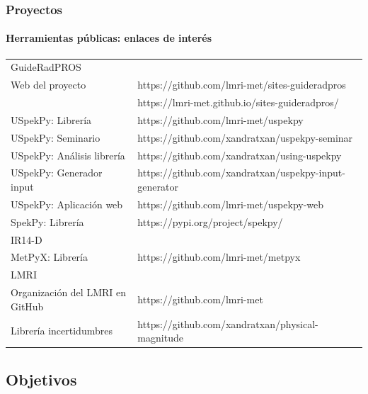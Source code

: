 \documentclass{beamer}
\begin{document}
	\begin{frame}
		\frametitle{Proyectos}
		\framesubtitle{Herramientas públicas: enlaces de interés}
		\centering
		\scriptsize
		\begin{tabular}{ll}			
			\rowcolor{blue!40}
			{\color{white}GuideRadPROS}&\\
			Web del proyecto&https://github.com/lmri-met/sites-guideradpros\\
			&https://lmri-met.github.io/sites-guideradpros/\\
			USpekPy: Librería&https://github.com/lmri-met/uspekpy\\
			USpekPy: Seminario&https://github.com/xandratxan/uspekpy-seminar\\
			USpekPy: Análisis librería&https://github.com/xandratxan/using-uspekpy\\
			USpekPy: Generador input&https://github.com/xandratxan/uspekpy-input-generator\\
			USpekPy: Aplicación web&https://github.com/lmri-met/uspekpy-web\\
			SpekPy: Librería&https://pypi.org/project/spekpy/\\
			\rowcolor{blue!40}
			{\color{white}IR14-D}&\\
			MetPyX: Librería&https://github.com/lmri-met/metpyx\\
			\rowcolor{blue!40}
			{\color{white}LMRI}&\\
			Organización del LMRI en GitHub&https://github.com/lmri-met\\
			Librería incertidumbres&https://github.com/xandratxan/physical-magnitude\\
		\end{tabular}
	\end{frame}
	
	\subsection{Objetivos}
	
\end{document}
